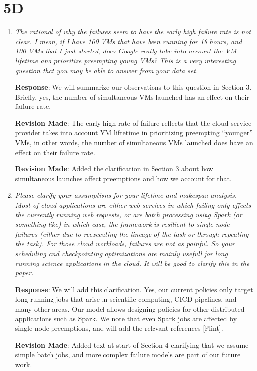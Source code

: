 \documentclass{article}
\newcommand{\resp}[1]{\textbf{Response}: #1}
\newcommand{\revmade}[1]{\textbf{Revision Made}: #1}
\begin{document}
\section{5D}

\begin{enumerate}

\item \emph{The rational of why the failures seem to have the early high failure rate is not clear. I mean, if I have 100 VMs that have been running for 10 hours, and 100 VMs that I just started, does Google really take into account the VM lifetime and prioritize preempting young VMs? This is a very interesting question that you may be able to answer from your data set.}

\resp{We will summarize our observations to this question in Section 3. Briefly, yes, the number of simultaneous VMs launched has an effect on their failure rate.}

\revmade{The early high rate of failure reflects that the cloud service provider takes into account VM liftetime in prioritizing preempting ``younger'' VMs, in other words, the number of simultaneous VMs launched does have an effect on their failure rate.}

\revmade{Added the clarification in Section 3 about how simultaneous launches affect preemptions and how we account for that.}


\item \emph{Please clarify your assumptions for your lifetime and makespan analysis. Most of cloud applications are either web services in which failing only effects the currently running web requests, or are batch processing using Spark (or something like) in which case, the framework is resilient to single node failures (either due to reexecuting the lineage of the task or through repeating the task). For those cloud workloads, failures are not as painful. So your scheduling and checkpointing optimizations are mainly usefull for long running science applications in the cloud. It will be good to clarify this in the paper.}

\resp{We will add this clarification. Yes, our current policies only target long-running jobs that arise in scientific computing, CICD pipelines, and many other areas. Our model allows designing policies for other distributed applications such as Spark. We note that even Spark jobs are affected by single node preemptions, and will add the relevant references [Flint]}.


\revmade{Added text at start of Section 4 clarifying that we assume simple batch jobs, and more complex failure models are part of our future work.}


\end{enumerate}
\end{document}
